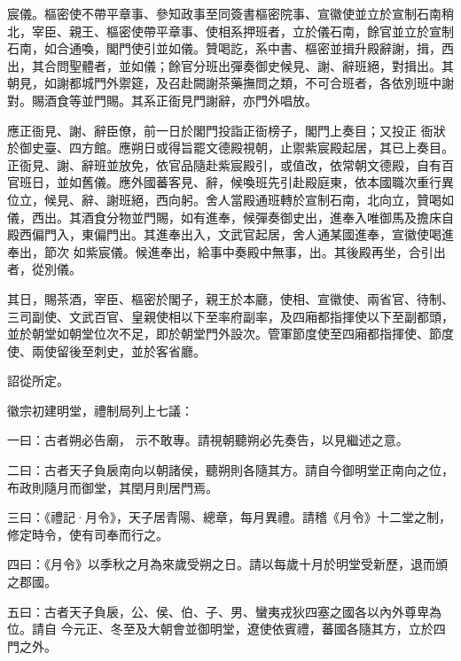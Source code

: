 \begin{pinyinscope}
 宸儀。樞密使不帶平章事、參知政事至同簽書樞密院事、宣徽使並立於宣制石南稍北，宰臣、親王、樞密使帶平章事、使相系押班者，立於儀石南，餘官並立於宣制石南，如合通喚，閣門使引並如儀。贊喝訖，系中書、樞密並揖升殿辭謝，揖，西出，其合問聖體者，並如儀；餘官分班出彈奏御史候見、謝、辭班絕，對揖出。其朝見，如謝都城門外禦筵，及召赴闕謝茶藥撫問之類，不可合班者，各依別班中謝對。賜酒食等並門賜。其系正衙見門謝辭，亦門外唱放。



 應正衙見、謝、辭臣僚，前一日於閣門投詣正衙榜子，閣門上奏目；又投正
 衙狀於御史臺、四方館。應朔日或得旨罷文德殿視朝，止禦紫宸殿起居，其已上奏目。正衙見、謝、辭班並放免，依官品隨赴紫宸殿引，或值改，依常朝文德殿，自有百官班日，並如舊儀。應外國蕃客見、辭，候喚班先引赴殿庭東，依本國職次重行異位立，候見、辭、謝班絕，西向躬。舍人當殿通班轉於宣制石南，北向立，贊喝如儀，西出。其酒食分物並門賜，如有進奉，候彈奏御史出，進奉入唯御馬及擔床自殿西偏門入，東偏門出。其進奉出入，文武官起居，舍人通某國進奉，宣徽使喝進奉出，節次
 如紫宸儀。候進奉出，給事中奏殿中無事，出。其後殿再坐，合引出者，從別儀。



 其日，賜茶酒，宰臣、樞密於閣子，親王於本廳，使相、宣徽使、兩省官、待制、三司副使、文武百官、皇親使相以下至率府副率，及四廂都指揮使以下至副都頭，並於朝堂如朝堂位次不足，即於朝堂門外設次。管軍節度使至四廂都指揮使、節度使、兩使留後至刺史，並於客省廳。



 詔從所定。



 徽宗初建明堂，禮制局列上七議：



 一曰：古者朔必告廟，
 示不敢專。請視朝聽朔必先奏告，以見繼述之意。



 二曰：古者天子負扆南向以朝諸侯，聽朔則各隨其方。請自今御明堂正南向之位，布政則隨月而御堂，其閏月則居門焉。



 三曰：《禮記·月令》，天子居青陽、總章，每月異禮。請稽《月令》十二堂之制，修定時令，使有司奉而行之。



 四曰：《月令》以季秋之月為來歲受朔之日。請以每歲十月於明堂受新歷，退而頒之郡國。



 五曰：古者天子負扆，公、侯、伯、子、男、蠻夷戎狄四塞之國各以內外尊卑為位。請自
 今元正、冬至及大朝會並御明堂，遼使依賓禮，蕃國各隨其方，立於四門之外。




\end{pinyinscope}
